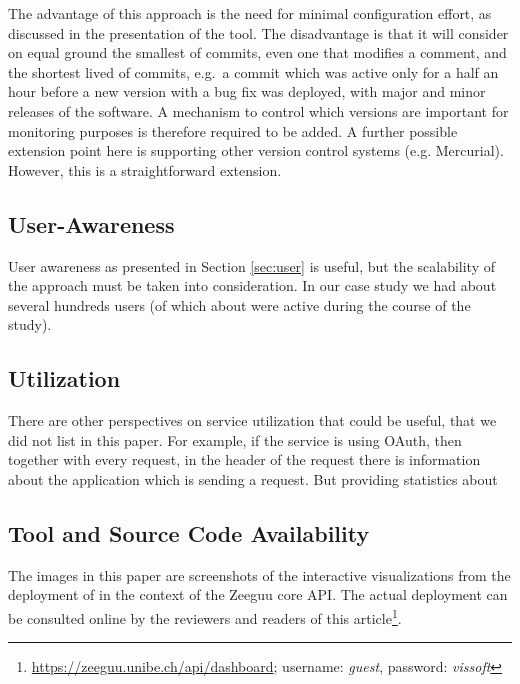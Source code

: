 \documentclass[conference]{IEEEtran}
\begin{document}
  The advantage of this approach is the need for minimal configuration effort, as discussed in the presentation of the tool. The disadvantage is that it will consider on equal ground the smallest of commits, even one that modifies a comment, and the shortest lived of commits, e.g.~a commit which was active only for a half an hour before a new version with a bug fix was deployed, with major and minor releases of the software. %
  A mechanism to control which versions are important for monitoring purposes is therefore required to be added.
%
  A further possible extension point here is supporting other version control systems (e.g. Mercurial). However, this is a straightforward extension.



  \subsection{User-Awareness }

    User awareness as presented in Section \ref{sec:user} is useful, but the scalability of the approach must be taken into consideration. In our case study we had about several hundreds users (of which about \activeUserCount were active during the course of the study).


  \subsection{Utilization}

    There are other perspectives on service utilization that could be useful, that we did not list in this paper. For example, if the service is using OAuth, then together with every request, in the header of the request there is information about the application which is sending a request. But providing statistics about 

  \subsection{Tool and Source Code Availability}
  \label{sec:install}

    The images in this paper are screenshots of the interactive visualizations from the deployment of \tool in the context of the Zeeguu core API. The actual deployment can be consulted online by the reviewers and readers of this article\footnote{\url{https://zeeguu.unibe.ch/api/dashboard}; username: {\em guest}, password: {\em vissoft}}.
\end{document}
